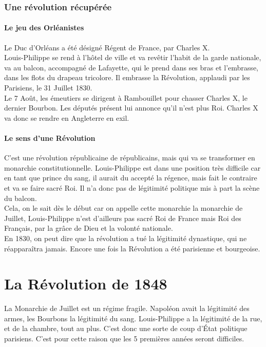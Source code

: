 \documentclass[10pt, a4paper, openany]{book}
\begin{document}
\subsection{Une révolution récupérée}

\subsubsection{Le jeu des Orléanistes}

Le Duc d'Orléans a été désigné Régent de France, par Charles X. \\
Louis-Philippe se rend à l'hôtel de ville et va revêtir l'habit de la garde nationale, va au balcon, accompagné de Lafayette, qui le prend dans ses bras et l'embrasse, dans les flots du drapeau tricolore. Il embrasse la Révolution, applaudi par les Parisiens, le 31 Juillet 1830. \\
Le 7 Août, les émeutiers se dirigent à Rambouillet pour chasser Charles X, le dernier Bourbon. Les députés présent lui annonce qu'il n'est plus Roi. Charles X va donc se rendre en Angleterre en exil. 

\subsubsection{Le sens d'une Révolution}

C'est une révolution républicaine de républicains, mais qui va se transformer en monarchie constitutionnelle. Louis-Philippe est dans une position très difficile car en tant que prince du sang, il aurait du accepté la régence, mais fait le contraire et va se faire sacré Roi. Il n'a donc pas de légitimité politique mis à part la scène du balcon. \\
Cela, on le sait dès le début car on appelle cette monarchie la monarchie de Juillet, Louis-Philippe n'est d'ailleurs pas sacré Roi de France mais Roi des Français, par la grâce de Dieu et la volonté nationale. \\
En 1830, on peut dire que la révolution a tué la légitimité dynastique, qui ne réapparaîtra jamais. Encore une fois la Révolution a été parisienne et bourgeoise. 

\chapter{La Révolution de 1848}

La Monarchie de Juillet est un régime fragile. Napoléon avait la légitimité des armes, les Bourbons la légitimité du sang. Louis-Philippe a la légitimité de la rue, et de la chambre, tout au plus. C'est donc une sorte de coup d'État politique parisiens. C'est pour cette raison que les 5 premières années seront difficiles. 
\end{document}
